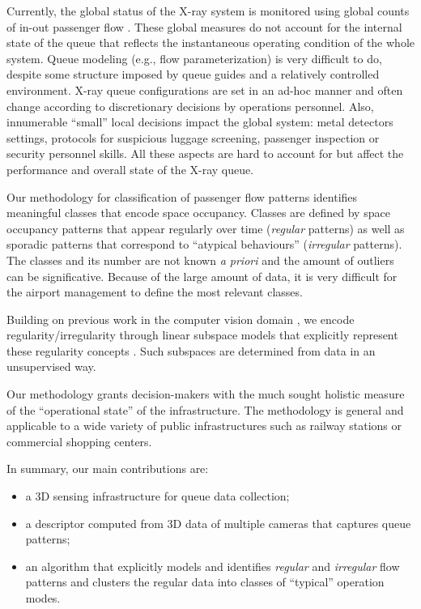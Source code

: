 Currently, the global status of the X-ray system is monitored using global counts of in-out passenger flow \cite{denman2015automatic,felkel2012comprehensive}. These global measures do not account for the internal state of the queue that reflects the instantaneous operating condition of the whole system.
Queue modeling (e.g., flow parameterization) is very difficult to do, despite some structure imposed by queue guides and a relatively controlled environment. X-ray queue configurations are set in an ad-hoc manner and often change according to discretionary decisions by operations personnel. 
Also, innumerable ``small'' local decisions impact the global system: metal detectors settings, protocols for suspicious luggage screening, passenger inspection or security personnel skills. 
All these aspects are hard to account for but affect the performance and overall state of the X-ray queue.

Our methodology for classification of passenger flow patterns identifies meaningful classes that encode space occupancy. Classes are defined by space occupancy patterns that appear regularly over time (\emph{regular} patterns) as well as sporadic patterns that correspond to ``atypical behaviours'' (\emph{irregular} patterns). 
The classes and its number are not known \emph{a priori} and the amount of outliers can be significative.
Because of the large amount of data, it is very difficult for the airport management to define the most relevant classes.

Building on previous work in the computer vision domain \cite{oat2016mfs}, we encode regularity/irregularity through linear subspace models that explicitly represent these regularity concepts \cite{soltanolkotabi2012geometric,elhamifar2013sparse}. Such subspaces are determined from data in an unsupervised way. 

Our methodology grants decision-makers with the much sought holistic measure of the ``operational state'' of the infrastructure. The methodology is general and applicable to a wide variety of public infrastructures such as railway stations or commercial shopping centers.
%

In summary, our main contributions are:
\begin{itemize}
    \item a 3D sensing infrastructure for queue data collection;
	\item a descriptor computed from 3D data of multiple cameras that captures queue patterns;
    \item an algorithm that explicitly models and identifies \emph{regular} and \emph{irregular} flow patterns and clusters the regular data into classes of ``typical'' operation modes.
\end{itemize}
%

